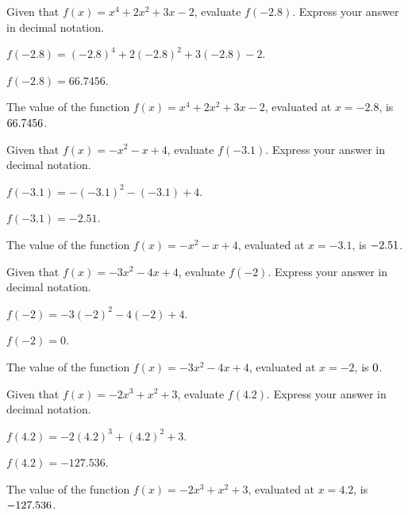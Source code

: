 \begin{shuffle}
\begin{exercise}
Given that $f(x)=x^4+2 x^2+3 x-2$, evaluate $f(-2.8)$. Express your answer in decimal notation.
\begin{solution}
\begin{hint}
$f(-2.8)=(-2.8)^4+2 (-2.8)^2+3 (-2.8)-2$.
\end{hint}
\begin{hint}
$f(-2.8)=66.7456$.
\end{hint}
The value of the function $f(x) = x^4+2 x^2+3 x-2$, evaluated at $x=-2.8$, is ${66.7456}$.
\end{solution}
\end{exercise}

\begin{exercise}
Given that $f(x)=-x^2-x+4$, evaluate $f(-3.1)$. Express your answer in decimal notation.
\begin{solution}
\begin{hint}
$f(-3.1)=-(-3.1)^2-(-3.1)+4$.
\end{hint}
\begin{hint}
$f(-3.1)=-2.51$.
\end{hint}
The value of the function $f(x) = -x^2-x+4$, evaluated at $x=-3.1$, is ${-2.51}$.
\end{solution}
\end{exercise}

\begin{exercise}
Given that $f(x)=-3 x^2-4 x+4$, evaluate $f(-2)$. Express your answer in decimal notation.
\begin{solution}
\begin{hint}
$f(-2)=-3 (-2)^2-4 (-2)+4$.
\end{hint}
\begin{hint}
$f(-2)=0$.
\end{hint}
The value of the function $f(x) = -3 x^2-4 x+4$, evaluated at $x=-2$, is ${0}$.
\end{solution}
\end{exercise}

\begin{exercise}
Given that $f(x)=-2 x^3+x^2+3$, evaluate $f(4.2)$. Express your answer in decimal notation.
\begin{solution}
\begin{hint}
$f(4.2)=-2 (4.2)^3+(4.2)^2+3$.
\end{hint}
\begin{hint}
$f(4.2)=-127.536$.
\end{hint}
The value of the function $f(x) = -2 x^3+x^2+3$, evaluated at $x=4.2$, is ${-127.536}$.
\end{solution}
\end{exercise}


\end{shuffle}
